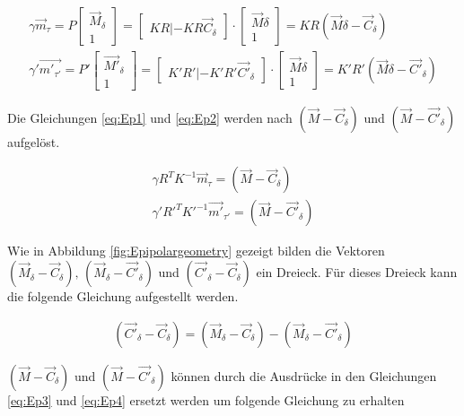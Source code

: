 \begin{gather}
	\gamma \vec{m}_\tau = P \begin{bmatrix}\vec{M}_\delta\\1\end{bmatrix} = 
	\begin{bmatrix}KR|-KR\vec{C}_\delta\end{bmatrix}\cdot \begin{bmatrix}\vec{M}\delta\\1\end{bmatrix} = KR(\vec{M}\delta - \vec{C}_\delta) \label{eq:Ep1} \\
	\gamma' \vec{m'_{\tau'}} = P' \begin{bmatrix}\vec{M'}_\delta\\1\end{bmatrix} = 
	\begin{bmatrix}K'R'|-K'R'\vec{C'}_\delta\end{bmatrix}\cdot \begin{bmatrix}\vec{M}\delta\\1\end{bmatrix} = K'R'(\vec{M}\delta - \vec{C'}_\delta)\label{eq:Ep2}
\end{gather}


Die Gleichungen \ref{eq:Ep1} und \ref{eq:Ep2} werden nach $(\vec{M}-\vec{C}_\delta)$ und $(\vec{M}-\vec{C'}_\delta)$ aufgelöst.

\begin{gather}
	\gamma R^TK^{-1}\vec{m}_\tau = (\vec{M}-\vec{C}_\delta)\label{eq:Ep3}\\
	\gamma' R'^TK'^{-1}\vec{m'}_{\tau'} = (\vec{M}-\vec{C'}_\delta)\label{eq:Ep4}
\end{gather}


Wie in Abbildung \ref{fig:Epipolargeometry} gezeigt bilden die Vektoren $(\vec{M}_\delta - \vec{C}_\delta),\, (\vec{M}_\delta - \vec{C'}_\delta)$ und $(\vec{C'}_\delta - \vec{C}_\delta)$ ein Dreieck. Für dieses Dreieck kann die folgende Gleichung aufgestellt werden. 

\begin{gather}
	(\vec{C'}_\delta - \vec{C}_\delta) = (\vec{M}_\delta - \vec{C}_\delta) - (\vec{M}_\delta - \vec{C'}_\delta)
\end{gather}

$(\vec{M}-\vec{C}_\delta)$ und $(\vec{M} - \vec{C'}_\delta)$ können durch die Ausdrücke in den Gleichungen \ref{eq:Ep3} und \ref{eq:Ep4} ersetzt werden um folgende Gleichung zu erhalten

